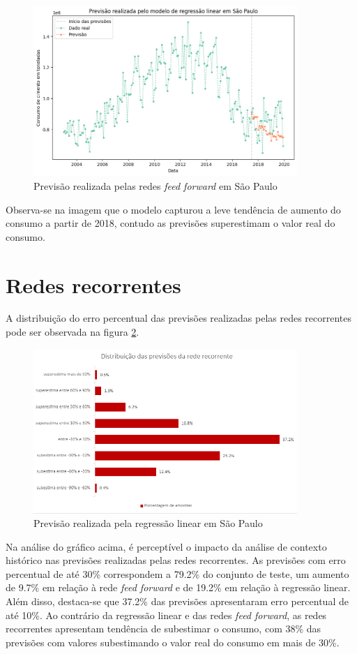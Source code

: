 \begin{figure}[H]
    \centering
    \includegraphics[width=10cm]{../figuras/graficos/mlp/prev_sp.png}
    \caption{Previsão realizada pelas redes \textit{feed forward} em São Paulo}
    \label{img:consumo-sp-rff}
\end{figure}

Observa-se na imagem que o modelo capturou a leve tendência de aumento do 
consumo a partir de 2018, contudo as previsões superestimam o valor real 
do consumo.

\section{Redes recorrentes}

A distribuição do erro percentual das previsões realizadas pelas redes 
recorrentes pode ser observada na figura \ref{img:erro-perc-rnn}.

\begin{figure}[H]
    \centering
    \includegraphics[width=10cm]{../figuras/graficos/rnn/erro-perc-rnn.png}
    \caption{Previsão realizada pela regressão linear em São Paulo}
    \label{img:erro-perc-rnn}
\end{figure}

Na análise do gráfico acima, é perceptível o impacto da análise de contexto histórico 
nas previsões realizadas pelas redes recorrentes. As previsões com erro percentual 
de até 30\% correspondem a 79.2\% do conjunto de teste, um aumento de 9.7\% em 
relação à rede \textit{feed forward} e de 19.2\% em relação à regressão linear.
Além disso, destaca-se que 37.2\% das previsões apresentaram erro percentual 
de até 10\%. Ao contrário da regressão linear e das redes \textit{feed forward},
as redes recorrentes apresentam tendência de subestimar o consumo, com 38\% das
previsões com valores subestimando o valor real do consumo em mais de 30\%.

